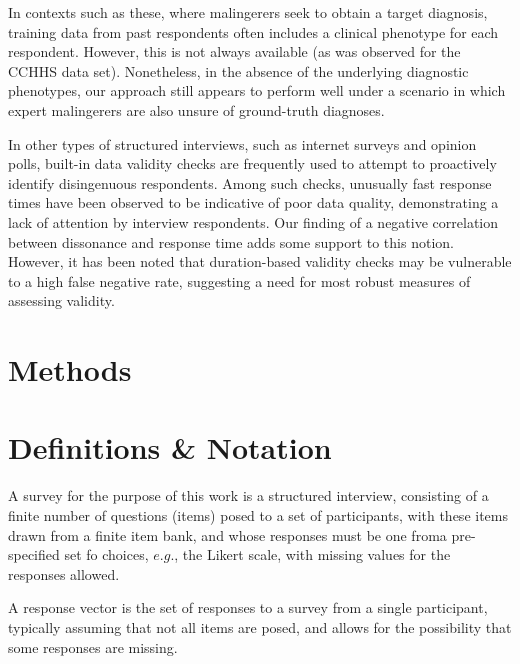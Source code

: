 \documentclass[onecolumn,10pt]{IEEEtran}
\begin{document}
In contexts such as these, where malingerers seek to obtain a target diagnosis, training data from past respondents often includes a clinical phenotype for each respondent. However, this is not always available (as was observed for the CCHHS data set). Nonetheless, in the absence of the underlying diagnostic phenotypes, our approach still appears to perform well under a scenario in which expert malingerers are also unsure of ground-truth diagnoses. 

In other types of structured interviews, such as internet surveys and opinion polls, built-in data validity checks are frequently used to attempt to proactively identify disingenuous respondents. Among such checks, unusually fast response times have been observed to be indicative of poor data quality\cite{malhotra2008completion,callegaro2009response}, demonstrating a lack of attention by interview respondents\cite{greszki2015exploring}. Our finding of a negative correlation between dissonance and response time adds some support to this notion. However, it has been noted that duration-based validity checks may be vulnerable to a high false negative rate\cite{kennedy2020assessing}, suggesting a need for most robust measures of assessing validity. 

\section*{Methods}

\section{Definitions \& Notation}

\begin{defn}[Survey]
  A survey for the purpose of this work is a structured interview, consisting of a finite number of questions (items) posed to a set of participants, with these items drawn from a finite item bank, and  whose responses must be one froma pre-specified set fo choices, $e.g.$, the Likert scale, with missing values for the responses allowed. 
\end{defn}


\begin{defn}
  A response vector is the set of responses to a survey from a single participant, typically assuming that not all items are posed, and allows for the possibility that some responses are missing.
\end{defn}
\end{document}
